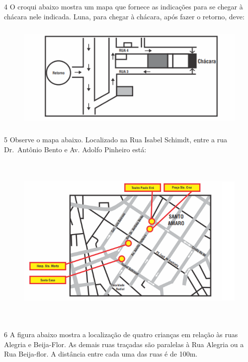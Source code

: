 {

\num{4}  O croqui abaixo mostra um mapa que fornece as indicações para se
chegar à chácara nele indicada. Luna, para chegar à chácara, após fazer o retorno, deve:

\begin{figure}
\includegraphics[width=4.95347in,height=2.04653in]{./imgSAEB_6_MAT/media/image67.png}
\end{figure}


\num{5}  Observe o mapa abaixo. Localizado na Rua Isabel Schimdt, entre a rua Dr.~Antônio Bento e Av.
Adolfo Pinheiro está:

\begin{figure}
\includegraphics[width=5.90625in,height=3.34375in]{./imgSAEB_6_MAT/media/image68.png}
\end{figure}


\num{6}  A figura abaixo mostra a localização de quatro crianças em relação às
ruas Alegria e Beija-Flor. As demais ruas traçadas são paralelas à Rua
Alegria ou a Rua Beija-flor. A distância entre cada uma das ruas é de
100m.

}
